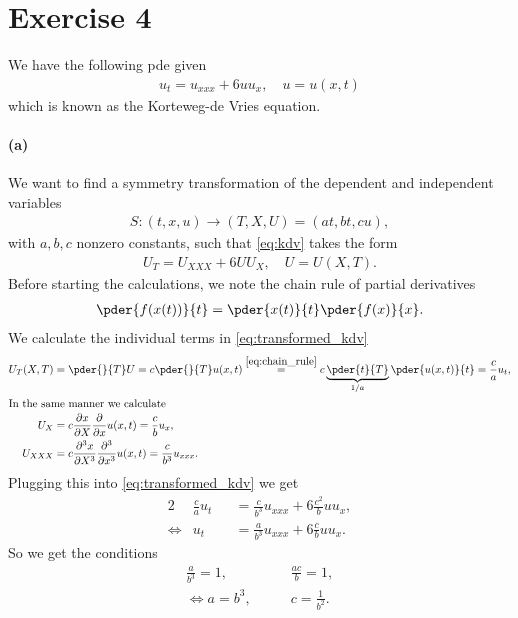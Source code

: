 \section{Exercise 4}
We have the following pde given
\begin{align}
u_t = u_{xxx} +6uu_x, \quad u=u(x,t) \label{eq:kdv}
\end{align}
which is known as the Korteweg-de Vries equation.
\paragraph{(a)}
We want to find a symmetry transformation of the dependent and independent variables
\begin{align}
S:(t,x,u)\rightarrow(T,X,U) = (at,bt,cu),
\end{align}
with $a,b,c$ nonzero constants, such that \cref{eq:kdv} takes the form
\begin{align}
U_T = U_{XXX} +6UU_X, \quad U=U(X,T).\label{eq:transformed_kdv}
\end{align}
Before starting the calculations, we note the chain rule of partial derivatives 
\begin{align}
\pder{f(x(t))}{t} = \pder{x(t)}{t}\pder{f(x)}{x}.\label{eq:chain_rule}
\end{align}
We calculate the individual terms in \cref{eq:transformed_kdv}
\begin{align}
U_T(X,T)&=\pder{}{T}U=c\pder{}{T}u(x,t) \stackrel{\cref{eq:chain_rule}}{=} c \underbrace{\pder{t}{T}}_{1/a}\pder{u(x,t)}{t}=\frac ca u_t,\\
\intertext{In the same manner we calculate}
U_X&= c\frac{\partial x}{\partial X} \frac{\partial}{\partial x} u(x,t)=\frac{c}{b} u_{x},\\
U_{XXX}&=c \frac{\partial^3 x}{\partial X^3} \frac{\partial^3}{\partial x^3} u(x,t)=\frac{c}{b^3} u_{xxx}.
\end{align}
Plugging this into \cref{eq:transformed_kdv} we get
\begin{alignat}{2}
 &\frac ca u_t &&= \frac{c}{b^3} u_{xxx} +6\frac{c^2}{b}uu_x,\\
\iff &   u_t &&= \frac{a}{b^3} u_{xxx} +6\frac{c}{b}uu_x.
\end{alignat}
So we get the conditions
\begin{align}
\frac{a}{b^3}=1, &\qquad \frac{ac}{b}=1,\\
\iff a=b^3,& \qquad c=\frac{1}{b^2}.
\end{align}